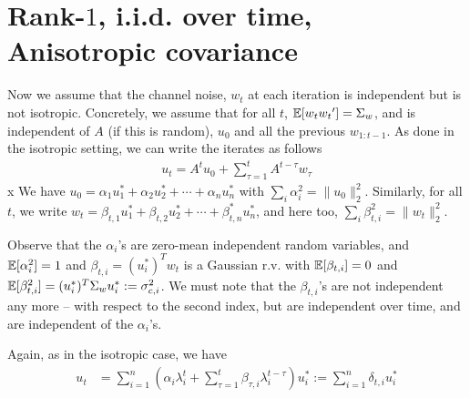 \documentclass[10pt]{article}
\newcommand{\nsrmax}{\text{NSR}}
\begin{document}



\section{Rank-$1$, i.i.d. over time, Anisotropic covariance}
Now we assume that the channel noise, $w_t$ at each iteration is independent but is not isotropic. Concretely, we assume that for all $t$, $\mathbb{E}[w_t w_t{}'] = \Sigma_w$, and is independent of $A$ (if this is random), $u_0$ and all the previous $w_{1:t-1}$. As done in the isotropic setting, we can write the iterates as follows
\begin{align*}
u_t = A^t u_0 + \sum_{\tau = 1}^t A^{t-\tau} w_\tau
\end{align*}
x
We have $u_0 = \alpha_1 u_1^* + \alpha_2 u_2^* + \cdots + \alpha_n u_n^*$ with $\sum_i \alpha_i^2 = \|u_0\|_2^2$. Similarly, for all $t$, we write $w_t = \beta_{t,1} u_1^* + \beta_{t,2} u_2^* +  \cdots + \beta_{t,n}^* u_n^*$, and here too, $\sum_i \beta_{t,i}^2 = \|w_t\|_2^2$. 

Observe that the $\alpha_i$'s are zero-mean independent random variables, and $\mathbb{E}[\alpha_i^2] = 1$ and $\beta_{t,i} = (u_i^*)^T w_t$ is a Gaussian r.v. with $\mathbb{E}[\beta_{t,i}] = 0$ and $\mathbb{E}[\beta_{t,i}^2] = (u_i^*)^T \Sigma_w u_i^* := \sigma_{c,i}^2$. We must note that the $\beta_{t,i}$'s are not independent any more -- with respect to the second index, but are independent over time, and are independent of the $\alpha_i$'s. 

Again, as in the isotropic case, we have 
\begin{align*}
u_t &= \sum_{i=1}^n \left(\alpha_i \lambda_i^t + \sum_{\tau=1}^t  \beta_{\tau,i} \lambda_i^{t - \tau}\right) u_i^*  := \sum_{i=1}^n \delta_{t,i}  u_i^*
\end{align*}
\end{document}
